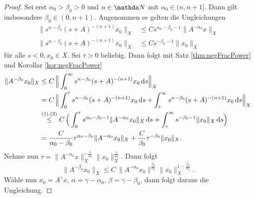 \begin{proof}
Sei erst $\alpha_0 > \beta_0 > 0$ und $n \in \N$ mit $\alpha_0 \in (n, n + 1]$. 
Dann gilt insbesondere $\beta_0 \in (0,n+1)$.
Angenommen es gelten die Ungleichungen
\begin{align}
  \|s^{n - \beta_0} (s + A)^{-(n + 1)} x_0 \|_X &
  \leq C s^{\alpha_0 - \beta_0 - 1} \|A^{-\alpha_0} x\|_X \tag{1} \\
  \|s^{n - \beta_0} (s+ A)^{-(n + 1)} x_0 \|_X &
  \leq C s^{-\beta_0 - 1} \|x_0\|_X \tag{2}
\end{align}
für alle $s < 0, x_0 \in X$. 
Sei $\tau > 0$ beliebig. Dann folgt mit Satz \ref{thm:negFracPower} und Korollar \ref{kor:negFracPower}
\begin{align*}
  \|A^{-\beta_0} x_0 \|_X
  &\leq C \, \Big\|\int_0^\infty s^{n - \beta_0} (s + A)^{-(n+1)} x_0 \, {\operatorname{d}\!{s}} \Big\|_X \\
  &= C \, \Big\| \int_0^\tau s^{n - \beta_0} (s + A)^{-(n + 1)} x_0 \, {\operatorname{d}\!{s}}  + \int_\tau^\infty s^{n - \beta_0} (s + A)^{-(n + 1)} x_0 \, {\operatorname{d}\!{s}}\Big\|_X \\
  &\overset{\text{(1),(2)}}{\leq} C \, \Big( \int_0^\tau s^{\alpha_0 - \beta_0 - 1} \| A^{-\alpha_0} x_0 \|_X \, {\operatorname{d}\!{s}} + \int_\tau^\infty s^{-\beta_0 - 1} \|x_0\|_X \, {\operatorname{d}\!{s}} \Big) \\
  &= \frac{C}{\alpha_0 - \beta_0} \tau^{\alpha_0 - \beta_0} \|A^{-\alpha_0} x_0 \|_X + \frac{C}{\beta_0} \tau^{-\beta_0} \|x_0\|_X.
\end{align*}
  Nehme nun $\tau = \|A ^{-\alpha_0} x\|_X^{-\frac{1}{\alpha_0}} \|x_0\|_X^{\frac{1}{\alpha_0}}$. 
  Dann folgt
  $$
  \|A^{-\beta_0} x_0\|_X \leq C \, \|A^{-\alpha_0} x_0\|^{\frac{\beta_0}{\alpha_0}} \|x_0\|_X^{1 - \frac{\beta_0}{\alpha_0}}.
  $$
  Wähle nun $x_0 = A^\gamma x$, $\alpha = \gamma - \alpha_0$, $\beta = \gamma - \beta_0$, dann folgt daraus die Ungleichung.


\end{proof}

